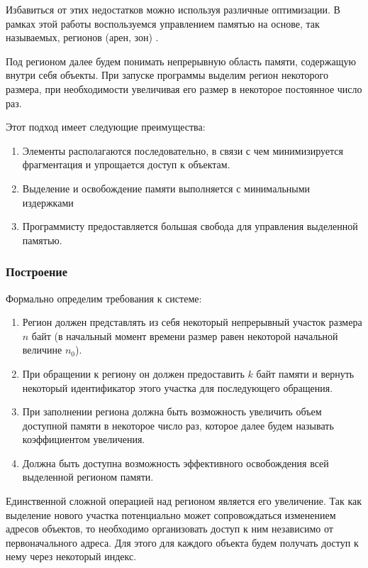 \documentclass[coursework]{SCWorks}
\begin{document}
Избавиться от этих недостатков можно используя различные оптимизации. В рамках 
этой работы воспользуемся управлением памятью на основе, так называемых, 
регионов (арен, зон) \cite{JohnLevine}.

Под регионом далее будем понимать непрерывную область памяти, содержащую внутри 
себя объекты. При запуске программы выделим регион некоторого размера, при 
необходимости увеличивая его размер в некоторое постоянное
число раз.

Этот подход имеет следующие преимущества:
\begin{enumerate}
    \item Элементы располагаются последовательно, в связи с чем минимизируется
    фрагментация и упрощается доступ к объектам.
    \item Выделение и освобождение памяти выполняется с минимальными издержками
    \item Программисту предоставляется большая свобода для управления выделенной
    памятью.
\end{enumerate}

\subsubsection{Построение}
Формально определим требования к системе:
\begin{enumerate}
    \item Регион должен представлять из себя некоторый непрерывный участок 
    размера $n$ байт (в начальный момент времени размер равен некоторой 
    начальной величине $n_0$).
    \item При обращении к региону он должен предоставить $k$ байт памяти и 
    вернуть некоторый идентификатор этого участка для последующего обращения.
    \item При заполнении региона должна быть возможность увеличить объем 
    доступной памяти в некоторое число раз, которое далее будем называть
    коэффициентом увеличения.
    \item Должна быть доступна возможность эффективного освобождения всей 
    выделенной регионом памяти.
\end{enumerate}

Единственной сложной операцией над регионом является его увеличение.
Так как выделение нового участка потенциально может сопровождаться изменением 
адресов объектов, то необходимо организовать доступ к ним независимо от 
первоначального адреса. Для этого для каждого объекта будем получать доступ к 
нему через некоторый индекс. 
\end{document}
